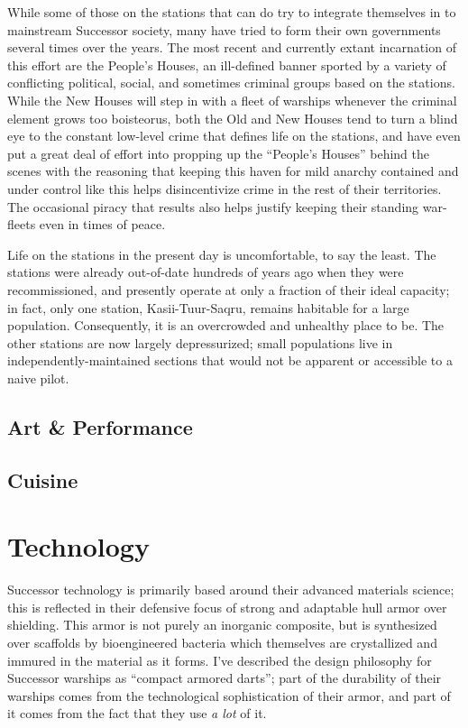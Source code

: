 \documentclass[11pt]{report}
\begin{document}
    While some of those on the stations that can do try to integrate themselves in to mainstream Successor society, many have tried to form their own governments several times over the years. The most recent and currently extant incarnation of this effort are the People's Houses, an ill-defined banner sported by a variety of conflicting political, social, and sometimes criminal groups based on the stations. While the New Houses will step in with a fleet of warships whenever the criminal element grows too boisteorus, both the Old and New Houses tend to turn a blind eye to the constant low-level crime that defines life on the stations, and have even put a great deal of effort into propping up the ``People's Houses'' behind the scenes with the reasoning that keeping this haven for mild anarchy contained and under control like this helps disincentivize crime in the rest of their territories. The occasional piracy that results also helps justify keeping their standing war-fleets even in times of peace.

    Life on the stations in the present day is uncomfortable, to say the least. The stations were already out-of-date hundreds of years ago when they were recommissioned, and presently operate at only a fraction of their ideal capacity; in fact, only one station, Kasii-Tuur-Saqru, remains habitable for a large population. Consequently, it is an overcrowded and unhealthy place to be. The other stations are now largely depressurized; small populations live in independently-maintained sections that would not be apparent or accessible to a naive pilot.


    \subsection{Art \& Performance}
    \subsection{Cuisine}
    \section{Technology}
    Successor technology is primarily based around their advanced materials science; this is reflected in their defensive focus of strong and adaptable hull armor over shielding. This armor is not purely an inorganic composite, but is synthesized over scaffolds by bioengineered bacteria which themselves are crystallized and immured in the material as it forms. I've described the design philosophy for Successor warships as ``compact armored darts''; part of the durability of their warships comes from the technological sophistication of their armor, and part of it comes from the fact that they use \emph{a lot} of it.
\end{document}
